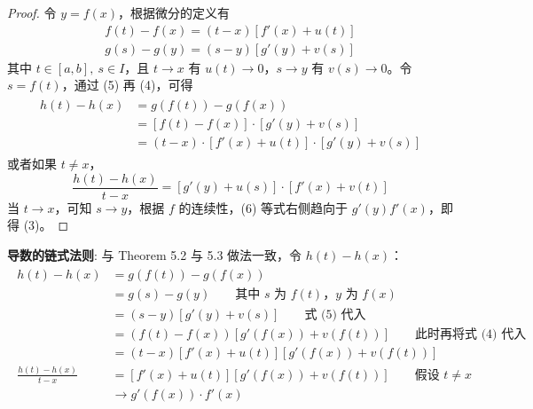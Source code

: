 \documentclass[../poma-notes.tex]{subfiles}
\begin{document}
\begin{proof}
  令 $y = f(x)$，根据微分的定义有
  \begin{align}
    f(t) - f(x) = (t - x)[f'(x) + u(t)] \\
    g(s) - g(y) = (s - y)[g'(y) + v(s)]
  \end{align}
  其中 $t \in [a,b],\ s \in I$，且 $t \to x$ 有 $u(t) \to 0$，$s \to y$ 有 $v(s) \to 0$。令 $s = f(t)$，通过 (5)
  再 (4)，可得
  \begin{align*}
    \begin{split}
      h(t) - h(x) & = g(f(t)) - g(f(x)) \\
      & = [f(t) - f(x)] \cdot [g'(y) + v(s)] \\
      & = (t - x) \cdot [f'(x) + u(t)] \cdot [g'(y) + v(s)]
    \end{split}
  \end{align*}
  或者如果 $t \ne x$，
  \begin{equation}
    \frac{h(t) - h(x)}{t - x} = [g'(y) + u(s)] \cdot [f'(x) + v(t)]
  \end{equation}
  当 $t \to x$，可知 $s \to y$，根据 $f$ 的连续性，(6) 等式右侧趋向于 $g'(y) f'(x)$，即得 (3)。
\end{proof}

\begin{anote}
  \textbf{导数的链式法则}: 与 Theorem 5.2 与 5.3 做法一致，令 $h(t) - h(x)$：
  \begin{align*}
    \begin{split}
      h(t) - h(x) &= g(f(t)) - g(f(x)) \\
      &= g(s) - g(y) \qquad \text{其中 $s$ 为 $f(t)$，$y$ 为 $f(x)$} \\
      &= (s - y)[g'(y) + v(s)] \qquad \text{式 (5) 代入} \\
      &= (f(t) - f(x))[g'(f(x)) + v(f(t))] \qquad \text{此时再将式 (4) 代入} \\
      &= (t - x)[f'(x) + u(t)][g'(f(x)) + v(f(t))] \\
      \frac{h(t) - h(x)}{t - x} &= [f'(x) + u(t)][g'(f(x)) + v(f(t))] \qquad \text{假设 $t \ne x$} \\
      &\to g'(f(x)) \cdot f'(x)
    \end{split}
  \end{align*}
\end{anote}
\end{document}
